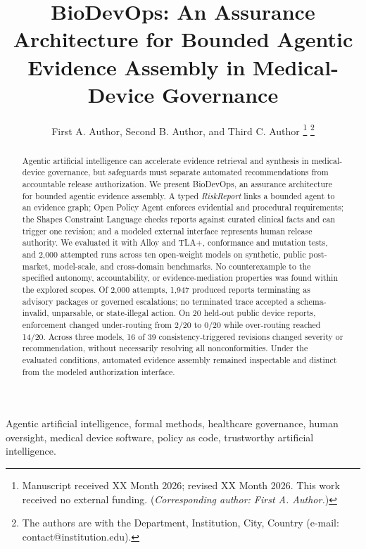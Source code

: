 \documentclass[journal,twoside,web]{ieeecolor}
\begin{document}
\title{BioDevOps: An Assurance Architecture for Bounded Agentic Evidence Assembly in Medical-Device Governance}

\author{First A. Author, Second B. Author, and Third C. Author
\thanks{Manuscript received XX Month 2026; revised XX Month 2026. This work received no external funding. (\textit{Corresponding author: First A. Author.})}
\thanks{The authors are with the Department, Institution, City, Country
(e-mail: contact@institution.edu).}}

\maketitle


\begin{abstract}
Agentic artificial intelligence can accelerate evidence retrieval and synthesis in medical-device governance, but safeguards must separate automated recommendations from accountable release authorization. We present BioDevOps, an assurance architecture for bounded agentic evidence assembly. A typed \textit{RiskReport} links a bounded agent to an evidence graph; Open Policy Agent enforces evidential and procedural requirements; the Shapes Constraint Language checks reports against curated clinical facts and can trigger one revision; and a modeled external interface represents human release authority. We evaluated it with Alloy and TLA+, conformance and mutation tests, and 2,000 attempted runs across ten open-weight models on synthetic, public post-market, model-scale, and cross-domain benchmarks. No counterexample to the specified autonomy, accountability, or evidence-mediation properties was found within the explored scopes. Of 2,000 attempts, 1,947 produced reports terminating as advisory packages or governed escalations; no terminated trace accepted a schema-invalid, unparsable, or state-illegal action. On 20 held-out public device reports, enforcement changed under-routing from 2/20 to 0/20 while over-routing reached 14/20. Across three models, 16 of 39 consistency-triggered revisions changed severity or recommendation, without necessarily resolving all nonconformities. Under the evaluated conditions, automated evidence assembly remained inspectable and distinct from the modeled authorization interface.
\end{abstract}

\begin{IEEEkeywords}
Agentic artificial intelligence, formal methods, healthcare governance, human oversight,
medical device software, policy as code, trustworthy artificial intelligence.
\end{IEEEkeywords}
\end{document}
